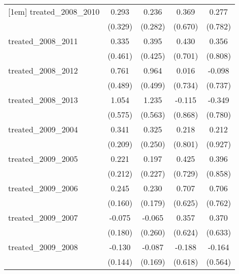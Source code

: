 {\begin{tabular}{l*{4}{c}}
[1em]
treated\_2008\_2010&       0.293         &       0.236         &       0.369         &       0.277         \\
            &     (0.329)         &     (0.282)         &     (0.670)         &     (0.782)         \\
[1em]
treated\_2008\_2011&       0.335         &       0.395         &       0.430         &       0.356         \\
            &     (0.461)         &     (0.425)         &     (0.701)         &     (0.808)         \\
[1em]
treated\_2008\_2012&       0.761         &       0.964         &       0.016         &      -0.098         \\
            &     (0.489)         &     (0.499)         &     (0.734)         &     (0.737)         \\
[1em]
treated\_2008\_2013&       1.054         &       1.235\sym{*}  &      -0.115         &      -0.349         \\
            &     (0.575)         &     (0.563)         &     (0.868)         &     (0.780)         \\
[1em]
treated\_2009\_2004&       0.341         &       0.325         &       0.218         &       0.212         \\
            &     (0.209)         &     (0.250)         &     (0.801)         &     (0.927)         \\
[1em]
treated\_2009\_2005&       0.221         &       0.197         &       0.425         &       0.396         \\
            &     (0.212)         &     (0.227)         &     (0.729)         &     (0.858)         \\
[1em]
treated\_2009\_2006&       0.245         &       0.230         &       0.707         &       0.706         \\
            &     (0.160)         &     (0.179)         &     (0.625)         &     (0.762)         \\
[1em]
treated\_2009\_2007&      -0.075         &      -0.065         &       0.357         &       0.370         \\
            &     (0.180)         &     (0.260)         &     (0.624)         &     (0.633)         \\
[1em]
treated\_2009\_2008&      -0.130         &      -0.087         &      -0.188         &      -0.164         \\
            &     (0.144)         &     (0.169)         &     (0.618)         &     (0.564)         \\

\end{tabular}}
